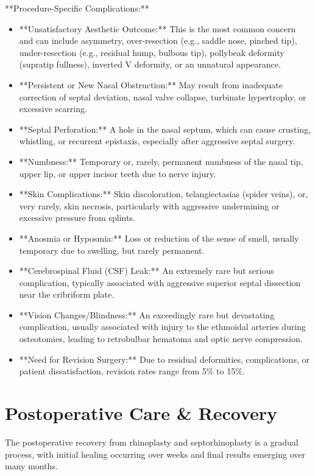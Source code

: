 **Procedure-Specific Complications:**
\begin{itemize}
  \item **Unsatisfactory Aesthetic Outcome:** This is the most common concern and can include asymmetry, over-resection (e.g., saddle nose, pinched tip), under-resection (e.g., residual hump, bulbous tip), pollybeak deformity (supratip fullness), inverted V deformity, or an unnatural appearance.
  
  \item **Persistent or New Nasal Obstruction:** May result from inadequate correction of septal deviation, nasal valve collapse, turbinate hypertrophy, or excessive scarring.
  
  \item **Septal Perforation:** A hole in the nasal septum, which can cause crusting, whistling, or recurrent epistaxis, especially after aggressive septal surgery.
  
  \item **Numbness:** Temporary or, rarely, permanent numbness of the nasal tip, upper lip, or upper incisor teeth due to nerve injury.
  
  \item **Skin Complications:** Skin discoloration, telangiectasias (spider veins), or, very rarely, skin necrosis, particularly with aggressive undermining or excessive pressure from splints.
  
  \item **Anosmia or Hyposmia:** Loss or reduction of the sense of smell, usually temporary due to swelling, but rarely permanent.
  
  \item **Cerebrospinal Fluid (CSF) Leak:** An extremely rare but serious complication, typically associated with aggressive superior septal dissection near the cribriform plate.
  
  \item **Vision Changes/Blindness:** An exceedingly rare but devastating complication, usually associated with injury to the ethmoidal arteries during osteotomies, leading to retrobulbar hematoma and optic nerve compression.
  
  \item **Need for Revision Surgery:** Due to residual deformities, complications, or patient dissatisfaction, revision rates range from 5\% to 15\%.
\end{itemize}

\section*{Postoperative Care \& Recovery}
The postoperative recovery from rhinoplasty and septorhinoplasty is a gradual process, with initial healing occurring over weeks and final results emerging over many months.

